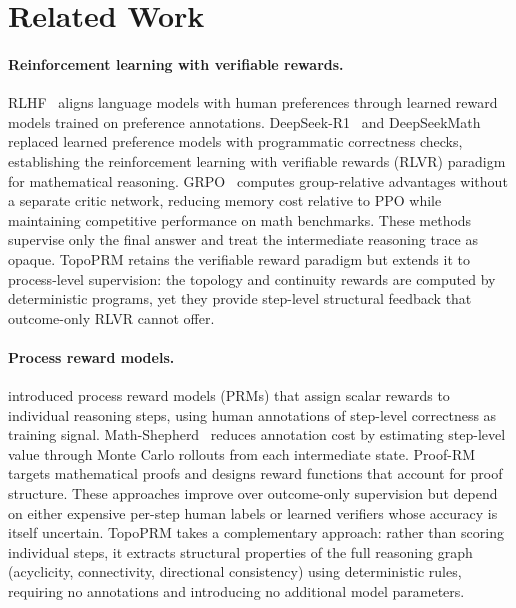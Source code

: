 \section{Related Work}
\label{sec:related_work}

\paragraph{Reinforcement learning with verifiable rewards.}
RLHF~\citep{ouyang2022training} aligns language models with human
preferences through learned reward models trained on preference
annotations. DeepSeek-R1~\citep{deepseekr1} and
DeepSeekMath~\citep{shao2024deepseekmath} replaced learned preference
models with programmatic correctness checks, establishing the
reinforcement learning with verifiable rewards (RLVR) paradigm for
mathematical reasoning. GRPO~\citep{shao2024deepseekmath} computes
group-relative advantages without a separate critic network, reducing
memory cost relative to PPO while maintaining competitive performance on
math benchmarks. These methods supervise only the final answer and treat
the intermediate reasoning trace as opaque. TopoPRM retains the
verifiable reward paradigm but extends it to process-level supervision:
the topology and continuity rewards are computed by deterministic
programs, yet they provide step-level structural feedback that
outcome-only RLVR cannot offer.

\paragraph{Process reward models.}
\citet{lightman2023lets} introduced process reward models (PRMs) that
assign scalar rewards to individual reasoning steps, using human
annotations of step-level correctness as training signal.
Math-Shepherd~\citep{wang2024math} reduces annotation cost by estimating
step-level value through Monte Carlo rollouts from each intermediate
state. Proof-RM~\citep{proofRM2026} targets mathematical proofs and
designs reward functions that account for proof structure. These
approaches improve over outcome-only supervision but depend on either
expensive per-step human labels or learned verifiers whose accuracy is
itself uncertain. TopoPRM takes a complementary approach: rather than
scoring individual steps, it extracts structural properties of the full
reasoning graph (acyclicity, connectivity, directional consistency) using
deterministic rules, requiring no annotations and introducing no
additional model parameters.

